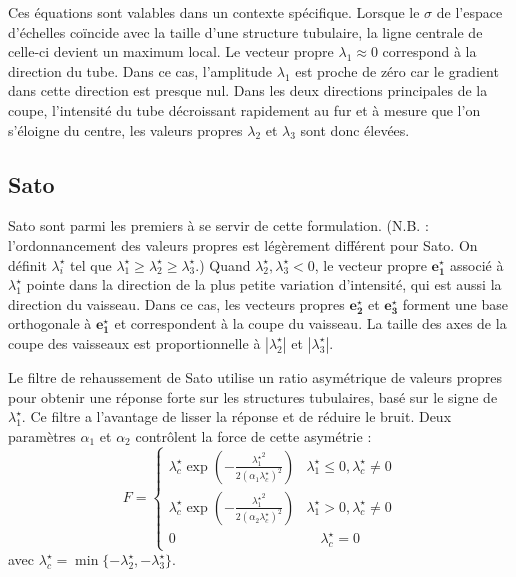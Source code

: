 Ces équations sont valables dans un contexte spécifique. Lorsque le $\sigma$ de l'espace d'échelles coïncide avec la taille d'une structure tubulaire, la ligne centrale de celle-ci devient un maximum local. Le vecteur propre $\lambda_1 \approx 0$ correspond à la direction du tube. Dans ce cas, l'amplitude $\lambda_1$ est proche de zéro car le gradient dans cette direction est presque nul. Dans les deux directions principales de la coupe, l'intensité du tube décroissant rapidement au fur et à mesure que l'on s'éloigne du centre, les valeurs propres $\lambda_2$ et $\lambda_3$ sont donc élevées.

\subsection{Sato}

Sato \etal \cite{Sato1998_vesselness} sont parmi les premiers à se servir de cette formulation. (N.B. : l'ordonnancement des valeurs propres est légèrement différent pour Sato. On définit $\lambda^\star_i$ tel que $\lambda^\star_1 \geqslant \lambda^\star_2  \geqslant  \lambda^\star_3$.)
Quand $\lambda^\star_2, \lambda^\star_3 < 0$, le vecteur propre $\mathbf {e^\star_1}$ associé à $\lambda^\star_1$ pointe dans la direction de la plus petite variation d'intensité, qui est aussi la direction du vaisseau.
Dans ce cas, les vecteurs propres $\mathbf {e^\star_2}$ et $\mathbf {e^\star_3}$ forment une base orthogonale à $\mathbf {e^\star_1}$ et correspondent à la coupe du vaisseau.
La taille des axes de la coupe des vaisseaux est proportionnelle à $|\lambda^\star_2|$ et $|\lambda^\star_3|$.

Le filtre de rehaussement de Sato utilise un ratio asymétrique de valeurs propres pour obtenir une réponse forte sur les structures tubulaires, basé sur le signe de $\lambda^\star_1$.
Ce filtre a l'avantage de lisser la réponse et de réduire le bruit. Deux paramètres $\alpha_1$ et $\alpha_2$ contrôlent la force de cette asymétrie :
\begin{equation}
\nonumber
F =
\left\{
\begin{array}{lr}
\lambda^\star_c \exp(-\frac{{\lambda^\star_1}^2}{2(\alpha_1 \lambda^\star_c)^2})  & \lambda^\star_1 \leqslant 0, \lambda^\star_c \neq 0 \\
\lambda^\star_c \exp(-\frac{{\lambda^\star_1}^2}{2(\alpha_2\lambda^\star_c)^2})  &  \lambda^\star_1 > 0, \lambda^\star_c \neq 0 \\
0 & \quad \lambda^\star_c = 0
\end{array}
\right.
\end{equation}
avec $\lambda^\star_c = \min\{-\lambda^\star_2,-\lambda^\star_3\}$.

